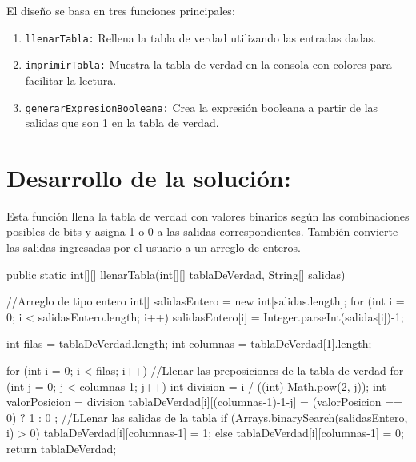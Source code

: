 \documentclass{IEEEcsmag}
\begin{document}
El diseño se basa en tres funciones principales:
\begin{enumerate}
    \item \texttt{llenarTabla:} Rellena la tabla de verdad utilizando las entradas dadas.
    \item \texttt{imprimirTabla:} Muestra la tabla de verdad en la consola con colores para facilitar la lectura.
    \item \texttt{generarExpresionBooleana:} Crea la expresión booleana a partir de las salidas que son 1 en la tabla de verdad.
\end{enumerate}

\section*{Desarrollo de la solución:}
Esta función llena la tabla de verdad con valores binarios según las combinaciones posibles de bits y asigna 1 o 0 a las salidas correspondientes. También convierte las salidas ingresadas por el usuario a un arreglo de enteros.
\begin{javaCode}
public static int[][] llenarTabla(int[][] tablaDeVerdad, String[] salidas){
    //Arreglo de tipo entero
    int[] salidasEntero = new int[salidas.length];
    for (int i = 0; i < salidasEntero.length; i++) {
        salidasEntero[i] = Integer.parseInt(salidas[i])-1;
    }
    
    int filas = tablaDeVerdad.length;
    int columnas = tablaDeVerdad[1].length;
    
    for (int i = 0; i < filas; i++) {
        //Llenar las preposiciones de la tabla de verdad
        for (int j = 0; j < columnas-1; j++) {
            int division = i / ((int) Math.pow(2, j));
            int valorPosicion = division %
            tablaDeVerdad[i][(columnas-1)-1-j] = (valorPosicion == 0)   ?   1 : 0 ;
        }
        //LLenar las salidas de la tabla
        if (Arrays.binarySearch(salidasEntero, i) > 0) {
            tablaDeVerdad[i][columnas-1] = 1;
        } else {
            tablaDeVerdad[i][columnas-1] = 0;
        }
    }
    return tablaDeVerdad;
}
\end{javaCode}
\end{document}
